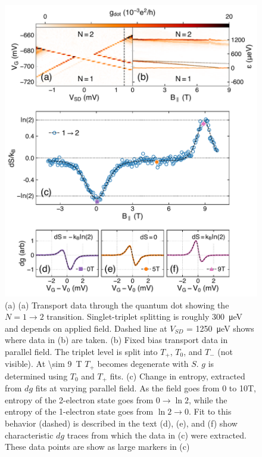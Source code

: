 \documentclass[twocolumn,showpacs,preprintnumbers,amsmath,amssymb,pra,aps,superscriptaddress]{revtex4-1}
\begin{document}
\begin{figure}
        \includegraphics[width=1.0\columnwidth]{../figures/figure_4.pdf}
        \caption{\label{fig:fig4}(a) (a) Transport data through the quantum dot showing the $N=1 \rightarrow 2$ transition. Singlet-triplet splitting is roughly \SI{300}{\micro\electronvolt} and depends on applied field. Dashed line at $V_{SD}$ = \SI{1250}{\micro\electronvolt} shows where data in (b) are taken. (b) Fixed bias transport data in parallel field. The triplet level is split into $T_+$, $T_0$, and $T_{-}$ (not visible). At \SI[input-protect-tokens]{\sim 9}{\tesla} $T_+$ becomes degenerate with $S$. $g$ is determined using $T_0$ and $T_+$ fits. (c) Change in entropy, extracted from $dg$ fits at varying parallel field. As the field goes from 0 to 10T, entropy of the 2-electron state goes from $0  \rightarrow \ln{2}$, while the entropy of the 1-electron state goes from $\ln{2} \rightarrow 0$. Fit to this behavior (dashed) is described in the text (d), (e), and (f) show characteristic $dg$ traces from which the data in (c) were extracted. These data points are show as large markers in (c)}
\end{figure}
\end{document}

